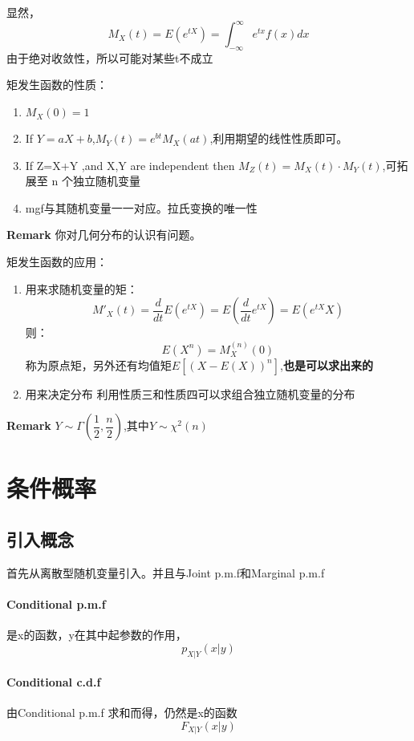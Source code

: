 \documentclass[12pt,a4paper]{ctexart}
\begin{document}
显然，
\[ M_X \left(t\right)=E \left(e ^{tX}\right)=
\int_{-\infty}^{\infty} e ^{tx} f \left(x\right) dx\]
由于绝对收敛性，所以可能对某些t不成立

矩发生函数的性质：
\begin{enumerate}
	\item $ M_X\left(0\right) =1$
	\item If $ Y=aX+b $,$ M_Y \left(t\right)=e^{bt} M_X \left(at\right)$,利用期望的线性性质即可。
	\item If Z=X+Y ,and X,Y are independent then $ 
	M_Z \left(t\right)=M_X \left(t\right) \cdot M_Y \left(t\right) $,可拓展至 n 个独立随机变量
	\item mgf与其随机变量一一对应。拉氏变换的唯一性
\end{enumerate}

\textbf{Remark} 你对几何分布的认识有问题。

矩发生函数的应用：
\begin{enumerate}
	\item 用来求随机变量的矩：
	\[ M'_X \left(t\right)=\dfrac{d}{dt} E \left(e^{tX}\right)=E \left(\dfrac{d}{dt} e^{tX}\right)=
	E \left(e^{tX}X\right)\]
	则：\[ E \left(X^n\right)=M_X^{(n)} \left(0\right)\]
	称为原点矩，另外还有均值矩$ E\left[\left(X-E \left(X \right) \right)^n\right]  $,\textbf{也是可以求出来的}
	\item 用来决定分布
	利用性质三和性质四可以求组合独立随机变量的分布
\end{enumerate}

\textbf{Remark} $ Y \sim \Gamma \left(\dfrac{1}{2},\dfrac{n}{2}\right) $,其中$ Y \sim \chi ^2 \left(n\right) $

\section{条件概率}
\subsection{引入概念}
首先从离散型随机变量引入。并且与Joint p.m.f和Marginal p.m.f
\paragraph{Conditional p.m.f}
是x的函数，y在其中起参数的作用，\[ p_{X|Y} \left(x|y\right)\]
\paragraph{Conditional c.d.f}
由Conditional p.m.f 求和而得，仍然是x的函数
\[ F_{X|Y} \left(x|y\right)\]
\end{document}
